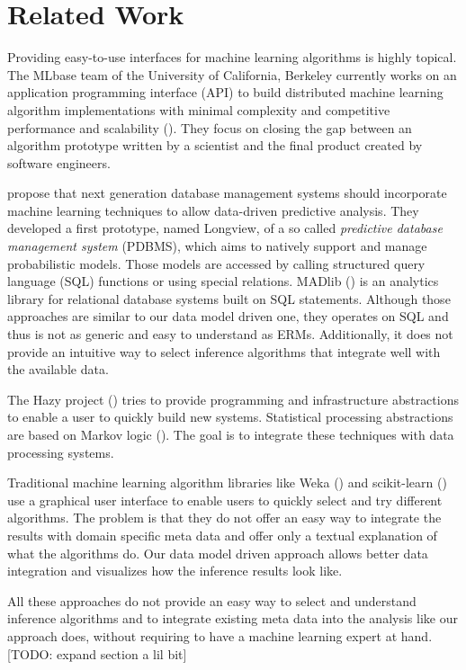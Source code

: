 \section{Related Work}

Providing easy-to-use interfaces for machine learning algorithms is highly topical. The MLbase team of the University of California, Berkeley currently works on an application programming interface (API) to build distributed machine learning algorithm implementations with minimal complexity and competitive performance and scalability (\cite{sparks2013mli}). They focus on closing the gap between an algorithm prototype written by a scientist and the final product created by software engineers.

\textcite{akdere2011case} propose that next generation database management systems should incorporate machine learning techniques to allow data-driven predictive analysis. They developed a first prototype, named Longview, of a so called \emph{predictive database management system} (PDBMS), which aims to natively support and manage probabilistic models. Those models are accessed by calling structured query language (SQL) functions or using special relations. MADlib (\cite{hellerstein2012madlib}) is an analytics library for relational database systems built on SQL statements. Although those approaches are similar to our data model driven one, they operates on SQL and thus is not as generic and easy to understand as ERMs. Additionally, it does not provide an intuitive way to select inference algorithms that integrate well with the available data.

The Hazy project (\cite{kumar2013hazy}) tries to provide programming and infrastructure abstractions to enable a user to quickly build new systems. Statistical processing abstractions are based on Markov logic (\cite{domingos2007markov}). The goal is to integrate these techniques with data processing systems.

Traditional machine learning algorithm libraries like Weka (\cite{hall2009weka}) and scikit-learn (\cite{scikit-learn}) use a graphical user interface to enable users to quickly select and try different algorithms. The problem is that they do not offer an easy way to integrate the results with domain specific meta data and offer only a textual explanation of what the algorithms do. Our data model driven approach allows better data integration and visualizes how the inference results look like.

All these approaches do not provide an easy way to select and understand inference algorithms and to integrate existing meta data into the analysis like our approach does, without requiring to have a machine learning expert at hand. [TODO: expand section a lil bit]

